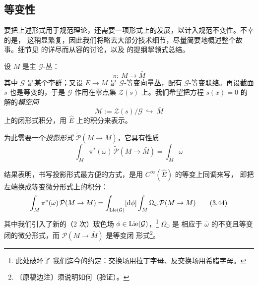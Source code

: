 \subsection{等变性}

要把上述形式用于规范理论，还需要一项形式上的发展，以计入规范不变性。不幸的是，
这稍显繁复，因此我们将略去大部分技术细节，尽量简要地概述整个故事。细节见
\cite{ref4} 的详尽而从容的讨论，以及 \cite{ref37} 的提纲挈领式总结。

设 $M$ 是主 $\mathcal G$-丛：
\begin{equation}
\pi:\ M\to\bar M
\tag{3.41}
\end{equation}
其中 $\mathcal G$ 是某个李群；又设 $E\to M$ 是 $\mathcal G$-等变向量丛，配有
$\mathcal G$-等变联络。再设截面 $s$ 也是等变的，于是 $\mathcal G$ 作用在零点集
$\mathcal Z(s)$ 上。我们希望把方程 $s(x)=0$ 的解的\emph{模空间}
\begin{equation}
\mathcal M := \mathcal Z(s)/\mathcal G\ \hookrightarrow\ \bar M
\tag{3.42}
\end{equation}
上的闭形式积分，用 $\widehat E$ 上的积分来表示。

为此需要一个\emph{投影形式} $\tilde{\mathcal P}(M\to\bar M)$，它具有性质
\begin{equation}
\int_M\pi^{\ast}(\bar\omega)\,\tilde{\mathcal P}(M\to\bar M)
= \int_{\bar M}\bar\omega
\tag{3.43}
\end{equation}

结果表明，书写投影形式最方便的方式，是用 $C^{\infty}(\widehat E)$ 的等变上同调来写，
即把左端换成等变微分形式上的积分：
\begin{equation}
\int_M\pi^{\ast}(\bar\omega)\,\tilde{\mathcal P}(M\to\bar M)
= \int_{\operatorname{Lie}(\mathcal G)}[\mathrm{d}\phi]\int_M\Omega_{\bar\omega}\,
\mathcal P(M\to\bar M)
\tag{3.44}
\end{equation}
其中我们引入了新的（2 次）玻色场 $\phi\in\operatorname{Lie}(\mathcal G)$，\footnote{此处破坏了
我们迄今的约定：交换场用拉丁字母、反交换场用希腊字母。} $\Omega_{\bar\omega}$ 是
相应于 $\bar\omega$ 的不变且等变闭的微分形式，而 $\mathcal P(M\to\bar M)$ 是等变闭
形式\footnote{〔原稿边注〕须说明如何（验证）。}。

